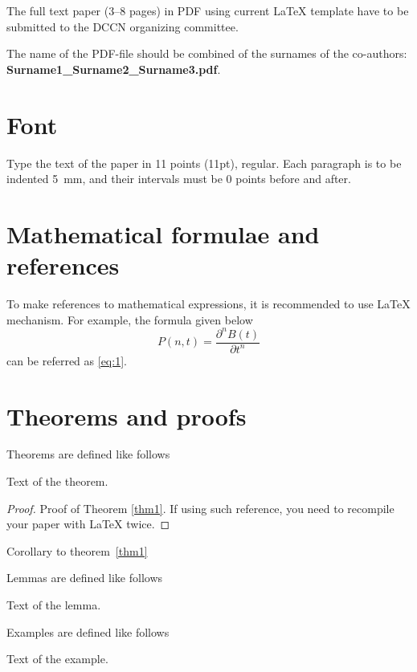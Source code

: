 \documentclass[11pt]{article}
\begin{document}
The full text paper (3--8 pages) in PDF using current \LaTeX{} template have to be submitted to the DCCN organizing committee.

The name of the PDF-file should be combined of the surnames of the co-authors:
\textbf{Surname1\_Surname2\_Surname3.pdf}.

\section{Font}

Type the text of the paper in 11 points (11pt), regular. Each
paragraph is to be indented 5~mm, and their intervals must be 0
points before and after.

\section{Mathematical formulae and references}

To make references to mathematical expressions, it is
recommended to use \LaTeX{} mechanism. For example, the formula
given below
\begin{equation}
\label{eq:1}
P(n,t)=\frac{\partial^n B(t)}{\partial t^n}
\end{equation}
can be referred as \eqref{eq:1}.

\section{Theorems and proofs}

Theorems are defined like follows
\begin{thm}\label{thm1}
Text of the theorem.
\end{thm}

\begin{proof}
Proof of Theorem \ref{thm1}. If using such reference, you need
to recompile your paper with \LaTeX{} twice.
\end{proof}

\begin{coroll}
Corollary to theorem~\ref{thm1}
\end{coroll}

Lemmas are defined like follows
\begin{lem}\label{lem1}
Text of the lemma.
\end{lem}

Examples are defined like follows
\begin{example}
Text of the example.
\end{example}
\end{document}
